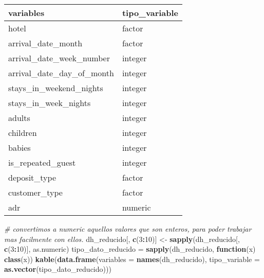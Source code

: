 \documentclass[]{article}
\newenvironment{Shaded}{\begin{snugshade}}{\end{snugshade}}
\newcommand{\CommentTok}[1]{\textcolor[rgb]{0.56,0.35,0.01}{\textit{#1}}}
\newcommand{\ControlFlowTok}[1]{\textcolor[rgb]{0.13,0.29,0.53}{\textbf{#1}}}
\newcommand{\DataTypeTok}[1]{\textcolor[rgb]{0.13,0.29,0.53}{#1}}
\newcommand{\DecValTok}[1]{\textcolor[rgb]{0.00,0.00,0.81}{#1}}
\newcommand{\KeywordTok}[1]{\textcolor[rgb]{0.13,0.29,0.53}{\textbf{#1}}}
\newcommand{\NormalTok}[1]{#1}
\newcommand{\OperatorTok}[1]{\textcolor[rgb]{0.81,0.36,0.00}{\textbf{#1}}}
\newcommand{\StringTok}[1]{\textcolor[rgb]{0.31,0.60,0.02}{#1}}
\begin{document}
\begin{Shaded}
\end{Shaded}

\begin{longtable}[]{@{}ll@{}}
\toprule
variables & tipo\_variable\tabularnewline
\midrule
\endhead
hotel & factor\tabularnewline
arrival\_date\_month & factor\tabularnewline
arrival\_date\_week\_number & integer\tabularnewline
arrival\_date\_day\_of\_month & integer\tabularnewline
stays\_in\_weekend\_nights & integer\tabularnewline
stays\_in\_week\_nights & integer\tabularnewline
adults & integer\tabularnewline
children & integer\tabularnewline
babies & integer\tabularnewline
is\_repeated\_guest & integer\tabularnewline
deposit\_type & factor\tabularnewline
customer\_type & factor\tabularnewline
adr & numeric\tabularnewline
\bottomrule
\end{longtable}

\begin{Shaded}
\begin{Highlighting}[]
\CommentTok{# convertimos a numeric aquellos valores que son enteros, para poder trabajar mas facilmente con ellos.}
\NormalTok{dh_reducido[, }\KeywordTok{c}\NormalTok{(}\DecValTok{3}\OperatorTok{:}\DecValTok{10}\NormalTok{)] <-}\StringTok{ }\KeywordTok{sapply}\NormalTok{(dh_reducido[, }\KeywordTok{c}\NormalTok{(}\DecValTok{3}\OperatorTok{:}\DecValTok{10}\NormalTok{)], as.numeric)}
\NormalTok{tipo_dato_reducido =}\StringTok{ }\KeywordTok{sapply}\NormalTok{(dh_reducido, }\ControlFlowTok{function}\NormalTok{(x) }\KeywordTok{class}\NormalTok{(x))}
\KeywordTok{kable}\NormalTok{(}\KeywordTok{data.frame}\NormalTok{(}\DataTypeTok{variables =} \KeywordTok{names}\NormalTok{(dh_reducido), }\DataTypeTok{tipo_variable =} \KeywordTok{as.vector}\NormalTok{(tipo_dato_reducido)))}
\end{Highlighting}
\end{Shaded}
\end{document}
